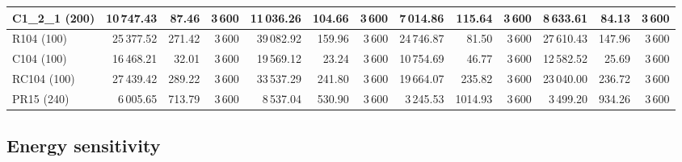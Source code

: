 \documentclass[11pt]{article}
\let\originalsubsection\subsection
\renewcommand{\subsection}{\FloatBarrier\originalsubsection}
\begin{document}
\begin{table}[H]
\begin{tabular}{l rrr rrr rrr rrr}
C1\_2\_1 (200) & 10\,747.43 & 87.46 & 3\,600 & 11\,036.26 & 104.66 & 3\,600 & 7\,014.86 & 115.64 & 3\,600 & 8\,633.61 & 84.13 & 3\,600 \\
\midrule
R104 (100) & 25\,377.52 & 271.42 & 3\,600 & 39\,082.92 & 159.96 & 3\,600 & 24\,746.87 & 81.50 & 3\,600 & 27\,610.43 & 147.96 & 3\,600 \\
C104 (100) & 16\,468.21 & 32.01 & 3\,600 & 19\,569.12 & 23.24 & 3\,600 & 10\,754.69 & 46.77 & 3\,600 & 12\,582.52 & 25.69 & 3\,600 \\
RC104 (100) & 27\,439.42 & 289.22 & 3\,600 & 33\,537.29 & 241.80 & 3\,600 & 19\,664.07 & 235.82 & 3\,600 & 23\,040.00 & 236.72 & 3\,600 \\
\midrule
PR15 (240) & 6\,005.65 & 713.79 & 3\,600 & 8\,537.04 & 530.90 & 3\,600 & 3\,245.53 & 1014.93 & 3\,600 & 3\,499.20 & 934.26 & 3\,600 \\
\bottomrule
\end{tabular}
\end{table}

\subsection{Energy sensitivity}\label{subsec:eta-sensitivity}
\end{document}
